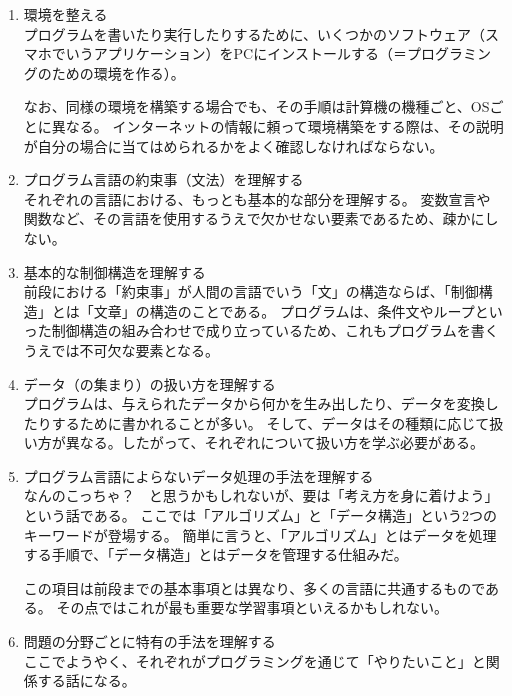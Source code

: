 \documentclass[lualatex,ja=standard,12pt,a4j]{bxjsbook}
\begin{document}
			\begin{enumerate}
				\item 環境を整える\\
				プログラムを書いたり実行したりするために、いくつかのソフトウェア（スマホでいうアプリケーション）をPCにインストールする（＝プログラミングのための環境を作る）。
                
				なお、同様の環境を構築する場合でも、その手順は計算機の機種ごと、OSごとに異なる。
                インターネットの情報に頼って環境構築をする際は、その説明が自分の場合に当てはめられるかをよく確認しなければならない。
				
				\item プログラム言語の約束事（文法）を理解する\\
                それぞれの言語における、もっとも基本的な部分を理解する。
                変数宣言や関数など、その言語を使用するうえで欠かせない要素であるため、疎かにしない。
			
				\item 基本的な制御構造を理解する\\
				前段における「約束事」が人間の言語でいう「文」の構造ならば、「制御構造」とは「文章」の構造のことである。
                プログラムは、条件文やループといった制御構造の組み合わせで成り立っているため、これもプログラムを書くうえでは不可欠な要素となる。
                
				\item データ（の集まり）の扱い方を理解する\\
				プログラムは、与えられたデータから何かを生み出したり、データを変換したりするために書かれることが多い。
                そして、データはその種類に応じて扱い方が異なる。したがって、それぞれについて扱い方を学ぶ必要がある。
				
				\item プログラム言語によらないデータ処理の手法を理解する\\
				なんのこっちゃ？　と思うかもしれないが、要は「考え方を身に着けよう」という話である。
                ここでは「アルゴリズム」と「データ構造」という2つのキーワードが登場する。
                簡単に言うと、「アルゴリズム」とはデータを処理する手順で、「データ構造」とはデータを管理する仕組みだ。
                
                この項目は前段までの基本事項とは異なり、多くの言語に共通するものである。
                その点ではこれが最も重要な学習事項といえるかもしれない。
				
				\item 問題の分野ごとに特有の手法を理解する\\
                ここでようやく、それぞれがプログラミングを通じて「やりたいこと」と関係する話になる。
                

\end{enumerate}
\end{document}
